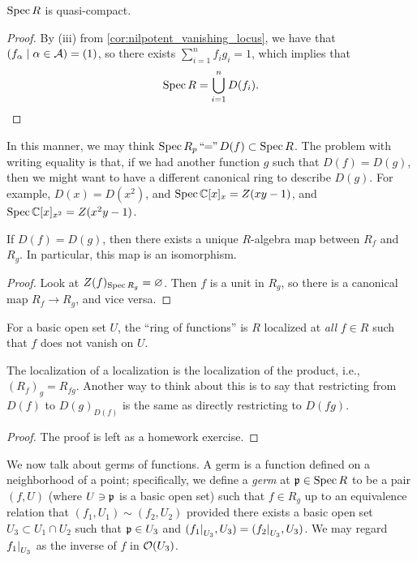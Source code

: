 \begin{corollary} \label{cor:spectrum_is_quasicompact}
    $\operatorname{Spec} R$ is quasi-compact.
\end{corollary}
\begin{proof}
    By (iii) from \ref{cor:nilpotent_vanishing_locus}, we have that $(f_\alpha \mid \alpha \in \mathcal A) = (1)$, so there exists $\sum_{i=1}^n f_i g_i = 1$, which implies that
    \[ \operatorname{Spec} R = \bigcup_{i=1}^n D(f_i). \qedhere \]
\end{proof} \vspace{-8pt}

In this manner, we may think $\operatorname{Spec} R_p \, ``\!\!=\!\!" \, D(f) \subset \operatorname{Spec} R$. The problem with writing equality is that, if we had another function $g$ such that $D(f) = D(g)$, then we might want to have a different canonical ring to describe $D(g)$. For example, $D(x) = D(x^2)$, and $\operatorname{Spec} \mathbb C[x]_x = Z(xy - 1)$, and $\operatorname{Spec} \mathbb C[x]_{x^2} = Z(x^2y - 1)$.

\begin{theorem} \label{thm:isomorphism_between_localizations_for_equal_nonvanishing_loci}
    If $D(f) = D(g)$, then there exists a unique $R$-algebra map between $R_f$ and $R_g$. In particular, this map is an isomorphism.
\end{theorem}
\begin{proof}
    Look at $Z(f)_{\operatorname{Spec} R_g} = \varnothing$. Then $f$ is a unit in $R_g$, so there is a canonical map $R_f \to R_g$, and vice versa.
\end{proof}

\begin{corollary} \label{cor:localization_and_vanishing_functions}
    For a basic open set $U$, the ``ring of functions'' is $R$ localized at \textit{all} $f \in R$ such that $f$ does not vanish on $U$.
\end{corollary}

\begin{theorem} \label{thm:localization_of_localization}
    The localization of a localization is the localization of the product, i.e., $(R_f)_g = R_{fg}$. Another way to think about this is to say that restricting from $D(f)$ to $D(g)_{D(f)}$ is the same as directly restricting to $D(fg)$.
\end{theorem}
\begin{proof}
    The proof is left as a homework exercise.
\end{proof}

We now talk about germs of functions. A germ is a function defined on a neighborhood of a point; specifically, we define a \textit{germ} at $\mathfrak p \in \operatorname{Spec} R$ to be a pair $(f, U)$ (where $U \ni \mathfrak p$ is a basic open set) such that $f \in R_g$ up to an equivalence relation that $(f_1, U_1) \sim (f_2, U_2)$ provided there exists a basic open set $U_3 \subset U_1 \cap U_2$ such that $\mathfrak p \in U_3$ and $(\restr{f_1}{U_3}, U_3) = (\restr{f_2}{U_3}, U_3)$. We may regard $\restr{f_1}{U_3}$ as the inverse of $f$ in $\mathcal O(U_3)$.

